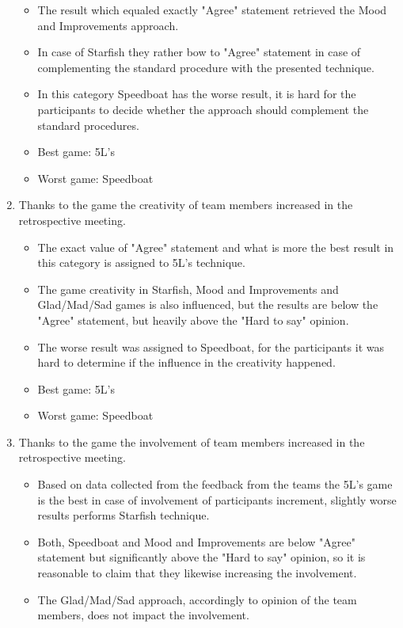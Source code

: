 \begin{enumerate}
\begin{itemize}
        \item The result which equaled exactly "Agree" statement retrieved the Mood and Improvements approach.
        \item In case of Starfish they rather bow to "Agree" statement in case of complementing the standard procedure with the presented technique.
        \item In this category Speedboat has the worse result, it is hard for the participants to decide whether the approach should complement the standard procedures.
        \item Best game: 5L's
        \item Worst game: Speedboat
    \end{itemize}
    \item Thanks to the game the creativity of team members increased in the retrospective meeting.
    \begin{itemize}
        \item The exact value of "Agree" statement and what is more the best result in this category is assigned to 5L's technique.
        \item The game creativity in Starfish, Mood and Improvements and Glad/Mad/Sad games is also influenced, but the results are below the "Agree" statement, but heavily above the "Hard to say" opinion.
        \item The worse result was assigned to Speedboat, for the participants it was hard to determine if the influence in the creativity happened. 
        \item Best game: 5L's
        \item Worst game: Speedboat
    \end{itemize}
    \item Thanks to the game the involvement of team members increased in the retrospective meeting.
    \begin{itemize}
        \item Based on data collected from the feedback from the teams the 5L's game is the best in case of involvement of participants increment, slightly worse results performs Starfish technique.
        \item Both, Speedboat and Mood and Improvements are below "Agree" statement but significantly above the "Hard to say" opinion, so it is reasonable to claim that they likewise increasing the involvement.
        \item The Glad/Mad/Sad approach, accordingly to opinion of the team members, does not impact the involvement.

\end{itemize}
\end{enumerate}
